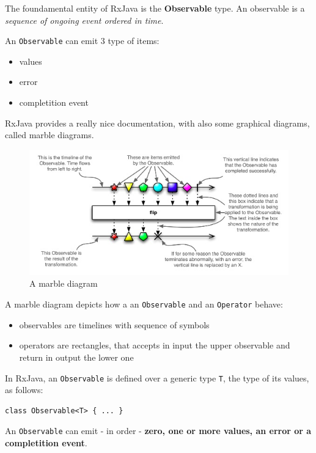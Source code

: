 The foundamental entity of RxJava is the \textbf{Observable} type. An
observable is a \emph{sequence of ongoing event ordered in time}.

An \texttt{Observable} can emit 3 type of items:

\begin{itemize}
\itemsep1pt\parskip0pt
\item
  values
\item
  error
\item
  completition event
\end{itemize}

RxJava provides a really nice documentation, with also some graphical
diagrams, called marble diagrams.

\begin{figure}[htbp]
\centering
\includegraphics[scale=0.75]{imgs/marble.png}
\caption{A marble diagram}
\end{figure}

A marble diagram depicts how a an \texttt{Observable} and an
\texttt{Operator} behave:

\begin{itemize}
\itemsep1pt\parskip0pt
\item
  observables are timelines with sequence of symbols
\item
  operators are rectangles, that accepts in input the upper observable
  and return in output the lower one
\end{itemize}

In RxJava, an \texttt{Observable} is defined over a generic type
\texttt{T}, the type of its values, as follows:

\begin{verbatim}
class Observable<T> { ... }
\end{verbatim}

An \texttt{Observable} can emit - in order - \textbf{zero, one or more
values, an error or a completition event}.

